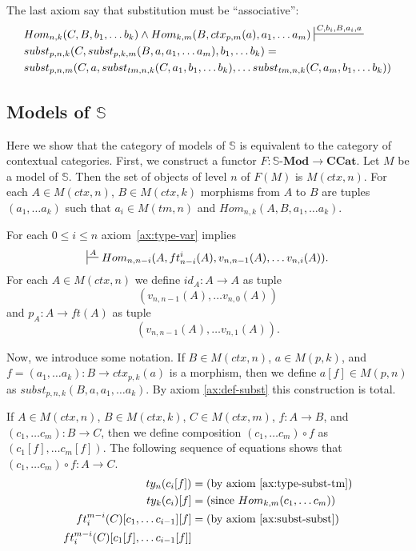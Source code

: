 \documentclass[reqno]{amsart}
\theoremstyle{definition}
\theoremstyle{remark}
\newcommand{\cat}[1]{\mathbf{#1}}
\newcommand{\ccat}{\cat{CCat}}
\newcommand{\substTh}{\mathbb{S}}
\newcommand{\Mod}[1]{#1\text{-}\cat{Mod}}
\numberwithin{figure}{section}
\begin{document}
The last axiom say that substitution must be ``associative'':
\begin{align}
\label{ax:subst-subst}
& Hom_{n,k}(C, B, b_1, \ldots b_k) \land Hom_{k,m}(B, ctx_{p,m}(a), a_1, \ldots a_m) \sststile{}{C, b_i, B, a_i, a} \\ \notag
& subst_{p,n,k}(C, subst_{p,k,m}(B, a, a_1, \ldots a_m), b_1, \ldots b_k) = \\ \notag
& subst_{p,n,m}(C, a, subst_{tm,n,k}(C, a_1, b_1, \ldots b_k), \ldots subst_{tm,n,k}(C, a_m, b_1, \ldots b_k))
\end{align}

\subsection{Models of $\substTh$}

Here we show that the category of models of $\substTh$ is equivalent to the category of contextual categories.
First, we construct a functor $F : \Mod{\substTh} \to \ccat$.
Let $M$ be a model of $\substTh$.
Then the set of objects of level $n$ of $F(M)$ is $M(ctx,n)$.
For each $A \in M(ctx,n)$, $B \in M(ctx,k)$ morphisms from $A$ to $B$ are tuples $(a_1, \ldots a_k)$ such that $a_i \in M(tm,n)$ and $Hom_{n,k}(A, B, a_1, \ldots a_k)$.

For each $0 \leq i \leq n$ axiom~\eqref{ax:type-var} implies
\[ \sststile{}{A} Hom_{n,n-i}(A, ft^i_{n-i}(A), v_{n,n-1}(A), \ldots v_{n,i}(A)). \]
For each $A \in M(ctx,n)$ we define $id_A : A \to A$ as tuple
\[ (v_{n,n-1}(A), \ldots v_{n,0}(A)) \]
and $p_A : A \to ft(A)$ as tuple
\[ (v_{n,n-1}(A), \ldots v_{n,1}(A)). \]

Now, we introduce some notation.
If $B \in M(ctx,n)$, $a \in M(p,k)$, and $f = (a_1, \ldots a_k) : B \to ctx_{p,k}(a)$ is a morphism, then we define $a[f] \in M(p,n)$ as $subst_{p,n,k}(B, a, a_1, \ldots a_k)$.
By axiom \eqref{ax:def-subst} this construction is total.

If $A \in M(ctx,n)$, $B \in M(ctx,k)$, $C \in M(ctx,m)$, $f : A \to B$, and $(c_1, \ldots c_m) : B \to C$,
    then we define composition $(c_1, \ldots c_m) \circ f$ as $(c_1[f], \ldots c_m[f])$.
The following sequence of equations shows that $(c_1, \ldots c_m) \circ f : A \to C$.
\begin{align*}
ty_n(c_i[f]) & = \text{(by axiom~\eqref{ax:type-subst-tm})} \\
ty_k(c_i)[f] & = \text{(since $Hom_{k,m}(c_1, \ldots c_m)$)} \\
ft^{m-i}_i(C)[c_1, \ldots c_{i-1}][f] & = \text{(by axiom~\eqref{ax:subst-subst})} \\
ft^{m-i}_i(C)[c_1[f], \ldots c_{i-1}[f]] &
\end{align*}
\end{document}
